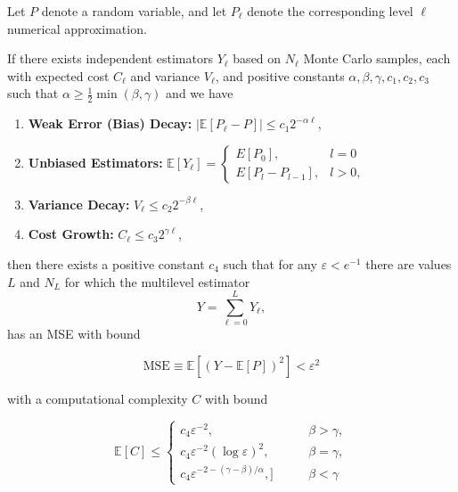 \begin{theorem}
    Let $P$ denote a random variable, and let $P_\ell$ denote the corresponding 
    level $\ell$ numerical approximation. 

    If there exists independent estimators $Y_\ell$ based on $N_\ell$ Monte Carlo
    samples, each with expected cost $C_\ell$ and variance $V_\ell$, and 
    positive constants $\alpha, \beta, \gamma,c_1, c_2, c_3$ such that 
    $\alpha \geq \frac{1}{2} \min(\beta, \gamma)$ and we have
    \begin{enumerate}
        \item \textbf{Weak Error (Bias) Decay: } $|\mathbb{E}[P_\ell - P]| \leq c_1 2^{-\alpha \ell}$,
        \item \textbf{Unbiased Estimators: } $\mathbb{E}[Y_\ell] = 
        \begin{cases}
            E[P_0], & l = 0 \\
            E[P_l - P_{l-1}], & l > 0,
        \end{cases}
        $
        \item \textbf{Variance Decay: } $V_\ell \leq c_2 2^{-\beta \ell}$,
        \item \textbf{Cost Growth: } $C_\ell \leq c_3 2^{\gamma \ell}$,
    \end{enumerate}
    then there exists a positive constant $c_4$ such that for any $\varepsilon < e^{-1}$ there
    are values $L$ and $N_L$ for which the multilevel estimator 
    \begin{equation*}
        Y = \sum_{\ell = 0}^L Y_\ell,
    \end{equation*}
    has an MSE with bound 

    \begin{equation}
        \text{MSE} \equiv \mathbb{E}\left[(Y - \mathbb{E}[P])^2\right] < \varepsilon^2
    \end{equation}

    with a computational complexity $C$ with bound

    \begin{equation}
        \mathbb{E}[C] \leq
        \begin{cases}
            c_4 \varepsilon^{-2}, \qquad &\beta > \gamma,\\
            c_4\varepsilon^{-2}(\log \varepsilon)^2, \qquad &\beta = \gamma,\\
            c_4\varepsilon^{-2-(\gamma - \beta)/\alpha}, ]\qquad &\beta < \gamma
        \end{cases}
    \end{equation}
\end{theorem}

